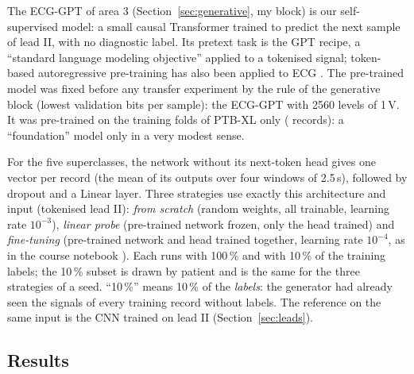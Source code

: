 The ECG-GPT of area 3 (Section~\ref{sec:generative}, my block) is our self-supervised model: a small
causal Transformer trained to predict the next sample of lead II, with no diagnostic label. Its
pretext task is the GPT recipe, a ``standard language modeling objective'' \cite[p.~3]{radford2018improving}
applied to a tokenised signal; token-based autoregressive pre-training has also been applied to ECG
\cite[p.~1]{yang2025heartllm}. The pre-trained model was fixed before any transfer experiment by the
rule of the generative block (lowest validation bits per sample): the ECG-GPT with 2560 levels of
1\,\textmu V. It was pre-trained on the training folds of PTB-XL only (\generativeNRecordsTrain{}
records): a ``foundation'' model only in a very modest sense.

For the five superclasses, the network without its next-token head gives one vector per record (the
mean of its outputs over four windows of 2.5\,s), followed by dropout and a Linear layer. Three
strategies use exactly this architecture and input (tokenised lead II):
\emph{from scratch} (random weights, all trainable, learning rate $10^{-3}$), \emph{linear probe}
(pre-trained network frozen, only the head trained) and \emph{fine-tuning} (pre-trained network and
head trained together, learning rate $10^{-4}$, as in the course notebook \cite{course_nb_transfer}).
Each runs with 100\,\% and with 10\,\% of the training labels; the 10\,\% subset is drawn by patient
and is the same for the three strategies of a seed. ``10\,\%'' means 10\,\% of the \emph{labels}:
the generator had already seen the signals of every training record without labels. The reference
on the same input is the CNN trained on lead II (Section~\ref{sec:leads}).

\subsection{Results}




